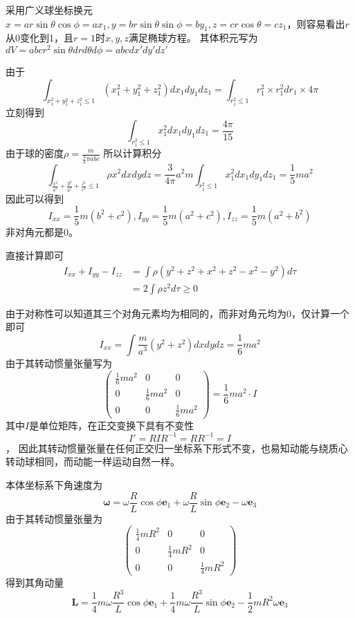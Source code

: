\begin{solution}
    采用广义球坐标换元$x=ar\sin\theta\cos\phi=ax_1,y=br\sin\theta\sin\phi=by_1,z=cr\cos\theta=cz_1$，则容易看出$r$从0变化到1，且$r=1$时$x,y,z$满足椭球方程。
    其体积元写为$dV=abcr^2\sin\theta dr d\theta d\phi=abcdx'dy'dz'$
    
    由于
    $$\int_{x_1^2+y_1^2+z_1^2\leq1}(x_1^2+y_1^2+z_1^2)dx_1dy_1dz_1=\int_{r_1^2\leq1}r_1^2\times r_1^2dr_1\times4\pi$$
    立刻得到
    $$\int_{r_1^2\leq1}x_1^2dx_1dy_1dz_1=\frac{4\pi}{15}$$
    由于球的密度$\rho=\frac{m}{\frac43\pi abc}$
    所以计算积分
    $$\int_{\frac{x^2}{a^2}+\frac{y^2}{b^2}+\frac{z^2}{c^2}\leq1}\rho x^2dxdydz=\frac{3}{4\pi}a^2m\int_{r_1^2\leq1}x_1^2dx_1dy_1dz_1=\frac{1}{5}ma^2$$
    因此可以得到
    $$I_{xx}=\frac15m(b^2+c^2),I_{yy}=\frac15m(a^2+c^2),I_{zz}=\frac15m(a^2+b^2)$$
    非对角元都是0。
\end{solution}
\begin{solution}
    直接计算即可
    \begin{align*}
        I_{xx}+I_{yy}-I_{zz}&=\int \rho(y^2+z^2+x^2+z^2-x^2-y^2)d\tau\\&=2\int\rho z^2d\tau\geq0
    \end{align*}
\end{solution}
\begin{solution}
    由于对称性可以知道其三个对角元素均为相同的，而非对角元均为0，仅计算一个即可
    $$I_{xx}=\int\frac{m}{a^3}(y^2+z^2)dxdydz=\frac16ma^2$$
    由于其转动惯量张量写为
    $$\begin{pmatrix}
        \frac16ma^2&0&0\\
        0&\frac16ma^2&0\\
        0&0&\frac16ma^2
    \end{pmatrix}=\frac16ma^2\cdot I$$
    其中$I$是单位矩阵，在正交变换下具有不变性
    $$I'=RIR^{-1}=RR^{-1}=I$$，
    因此其转动惯量张量在任何正交归一坐标系下形式不变，也易知动能与绕质心转动球相同，而动能一样运动自然一样。
\end{solution}
\begin{solution}
    本体坐标系下角速度为
    $$\boldsymbol{\omega}=\omega\frac{R}{L}\cos\phi \textbf{e}_1+\omega\frac{R}{L}\sin\phi \textbf{e}_2-\omega \textbf{e}_3$$
    由于其转动惯量张量为
    $$\begin{pmatrix}
        \frac14mR^2&0&0\\0&\frac14mR^2&0\\0&0&\frac14mR^2
    \end{pmatrix}$$
    得到其角动量
    $$\textbf{L}=\frac14m\omega\frac{R^3}{L}\cos\phi \textbf{e}_1+\frac{1}{4}m\omega\frac{R^3}{L}\sin\phi \textbf{e}_2-\frac12mR^2\omega\textbf{e}_3$$
\end{solution}
